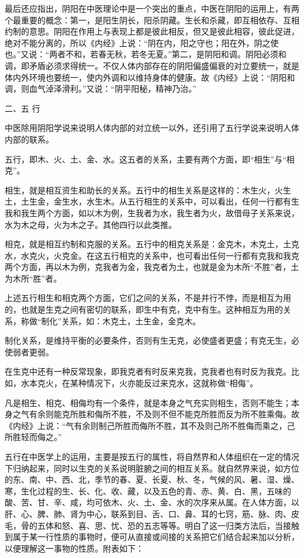 \documentclass[12pt,UTF8]{ctexbook}
\begin{document}
最后还应指出，阴阳在中医理论中是一个突出的重点，中医在阴阳的运用上，有两个最重要的概念：第一，是阳生阴长，阳杀阴藏。生长和杀藏，即互相依存、互相约制的意思。阴阳在作用上与表现上都是彼此相反，但又是彼此相容，彼此促进，绝对不能分离的，所以《内经》上说：“阴在内，阳之守也；阳在外，阴之使也。”又说：“两者不和，若春无秋，若冬无夏。”第二，是阴阳和调。阴阳必须和调，即矛盾必须求得统一。不仅人体内部存在的阴阳偏盛偏衰的对立要统一，就是体内外环境也要统一，使内外调和以维持身体的健康。故《内经》上说：“阴阳和调，则血气淖泽滑利。”又说：“阴平阳秘，精神乃治。”

二、五 行

中医除用阴阳学说来说明人体内部的对立统一以外，还引用了五行学说来说明人体内部的联系。

五行，即木、火、土、金、水。这五者的关系，主要有两个方面，即“相生”与“相克”。

相生，就是相互资生和助长的关系。五行中的相生关系是这样的：木生火，火生土，土生金，金生水，水生木。从五行相生的关系中，可以看出，任何一行都有生我和我生两个方面，如以木为例，生我者为水，我生者为火，故借母子关系来说，水为木之母，火为木之子。其他四行以此类推。

相克，就是相互约制和克服的关系。五行中的相克关系是：金克木，木克土，土克水，水克火，火克金。在这五行相克的关系中，也可看出任何一行都有克我和我克两个方面，再以木为例，克我者为金，我克者为土，也就是金为木所“不胜”者，土为木所“胜”者。

上述五行相生和相克两个方面，它们之间的关系，不是并行不悖，而是相互为用的，也就是生克之间有密切的联系，即生中有克，克中有生。这种相互为用的关系，称做“制化”关系，如：木克土，土生金，金克木。

制化关系，是维持平衡的必要条件，否则有生无克，必使盛者更盛；有克无生，必使弱者更弱。

在生克中还有一种反常现象，即我克者有时反来克我，克我者也有时反为我克。比如，水本克火，在某种情况下，火亦能反过来克水，这就称做“相侮”。

凡是相生、相克、相侮均有一个条件，就是本身之气充实则相生，否则不能生；本身之气有余则能克所胜和侮所不胜，不及则不但不能克所胜而反为所不胜乘侮。故《内经》上说：“气有余则制己所胜而侮所不胜，其不及则己所不胜侮而乘之，己所胜轻而侮之。”

五行在中医学上的运用，主要是按五行的属性，将自然界和人体组织在一定的情况下归纳起来，同时以生克的关系说明脏腑之间的相互关系。就自然界来说，如方位的东、南、中、西、北，季节的春、夏、长夏、秋、冬，气候的风、暑、湿、燥、寒，生化过程的生、长、化、收、藏，以及五色的青、赤、黄、白、黑，五味的酸、苦、甘、辛、咸，均可依木、火、土、金、水的次序来从属。在人体方面，以肝、心、脾、肺、肾为中心，联系到目、舌、口、鼻、耳的七窍，筋、脉、肉、皮毛，骨的五体和怒、喜、思、忧、恐的五志等等。明白了这一归类方法后，当接触到属于某一行性质的事物时，便可从直接或间接的关系把它们结合起来加以分析，以便理解这一事物的性质。附表如下：
\end{document}
